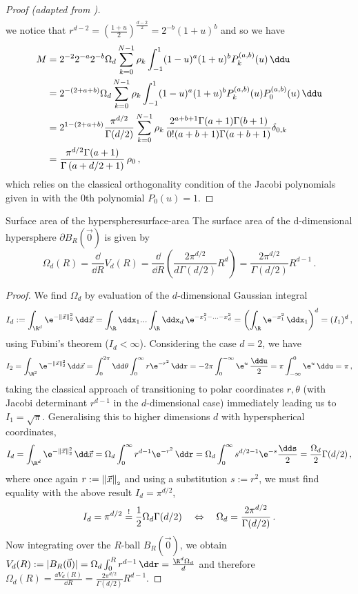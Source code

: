 \begin{proof}[Proof (adapted from \cite{2021-arbitrary-dimensions})]
\begin{align*}
  \end{align*}
  we notice that $r^{d-2} = \left(\frac{1+u}{2}\right)^{\frac{d-2}{2}} = 2^{-b} (1+u)^b$ and so we have
  \begin{align*}
    M & = 2^{-2} 2^{-a} 2^{-b} \Omega_d \sum_{k=0}^{N-1} \rho_k \int_{-1}^1 (1-u)^a (1+u)^{b} P_k^{(a,b)}(u) \,\ddu                                                 \\
      & = 2^{-(2+a+b)} \Omega_d \sum_{k=0}^{N-1} \rho_k \int_{-1}^1 (1-u)^a (1+u)^{b} P_k^{(a,b)}(u) P_0^{(a, b)}(u) \,\ddu                                         \\
      & = 2^{1-(2+a+b)} \frac{\pi^{d/2}}{\Gamma(d/2)} \sum_{k=0}^{N-1} \rho_k \, \frac{2^{a+b+1} \Gamma (a+1) \Gamma (b+1)}{0! (a+b+1) \Gamma (a+b+1)} \delta_{0,k} \\
      & = \frac{\pi^{{d/2}}\Gamma (a+1)}{\Gamma \left(a+{d/2}+1\right)} \,\rho_0\,,
  \end{align*}
  which relies on the classical orthogonality condition of the Jacobi polynomials given in  with the $0$th polynomial $P_0(u) = 1$.
\end{proof}

\begin{lemma}{Surface area of the hypersphere}{surface-area}
  The surface area of the d-dimensional hypersphere $\partial B_R(\vec{0})$ is given by
  $$\Omega_{d}(R) = \frac{\dd}{\dd R} V_d(R) = \frac{\dd}{\dd R} \left(\frac{2 \pi^{d/2}}{d \Gamma(d/2)} R^d\right) = \frac{2\pi^{d/2}}{\Gamma({d/2})} R^{d-1}\,.$$
\end{lemma}
\begin{proof}
  We find $\Omega_d$ by evaluation of the $d$-dimensional Gaussian integral
  $$I_d := \int_{\R^d} \e^{-\norm{\vec{x}}^2}\,\dd\vec{x} = \int_{\R} \ddx_1 ... \int_{\R} \ddx_d\, \e^{-x_1^2-...-x_d^2} = \left(\int_{\R} \e^{-x_1^2} \,\ddx_1\right)^d = (I_1)^d\,,$$
  using Fubini's theorem ($I_d < \infty$).
  Considering the case $d = 2$, we have
  $$I_2 = \int_{\R^2} \e^{-\norm{\vec{x}}^2} \,\dd\vec{x} = \int_0^{2\pi} \dd\theta \int_0^\infty r \e^{-r^2} \,\ddr = -2\pi \int_{0}^{-\infty} \e^u \,\frac{\ddu}{2} = \pi \int_{-\infty}^0 \e^u \,\ddu = \pi\,,$$
  taking the classical approach of transitioning to polar coordinates $r, \theta$ (with Jacobi determinant $r^{d-1}$ in the $d$-dimensional case) immediately leading us to $I_1 = \sqrt{\pi}$. Generalising this to higher dimensions $d$ with hyperspherical coordinates,
  $$I_d = \int_{\R^d} \e^{-\norm{\vec{x}}^2} \,\dd\vec{x} = \Omega_d \int_0^\infty r^{d-1} \e^{-r^2}\,\ddr = \Omega_d \int_0^\infty s^{{d/2}-1} \e^{-s} \frac{\dds}{2} = \frac{\Omega_d}{2} \Gamma(d/2)\,,$$
  where once again $r := \left\lVert\vec{x}\right\rVert_{\scriptscriptstyle 2}$ and using a substitution $s := r^2$, we must find equality with the above result $I_d = \pi^{d/2}$,
  $$I_d = \pi^{d/2} \overset{!}{=} \frac{1}{2}\Omega_d \Gamma(d/2) \quad\Leftrightarrow\quad \Omega_d = \frac{2\pi^{d/2}}{\Gamma(d/2)}\,.$$
  Now integrating over the $R$-ball $B_R(\vec{0})$, we obtain $V_d(R) := |B_R(\vec{0})| = \Omega_d \int_0^R r^{d-1} \,\ddr = \frac{\R^d \Omega_d}{d}$ and therefore $\Omega_{d}(R) = \frac{\dd V_d(R)}{\dd R} = \frac{2 \pi^{d/2}}{\Gamma(d/2)}R^{d-1}$.
\end{proof}
